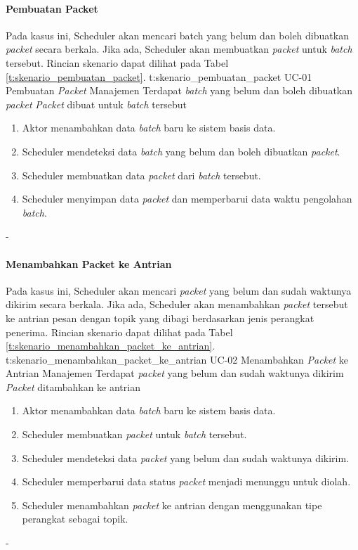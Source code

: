 \paragraph{Pembuatan Packet}
\par Pada kasus ini, Scheduler akan mencari batch yang belum dan boleh dibuatkan \textit{packet} secara berkala. Jika ada, Scheduler akan membuatkan \textit{packet} untuk \textit{batch} tersebut. Rincian skenario dapat dilihat pada Tabel \ref{t:skenario_pembuatan_packet}.
\tableUcDesc
{t:skenario_pembuatan_packet}
{UC-01}
{Pembuatan \textit{Packet}}
{Manajemen}
{Terdapat \textit{batch} yang belum dan boleh dibuatkan \textit{packet}}
{\textit{Packet} dibuat untuk \textit{batch} tersebut}
{
\begin{enumerate}
	\item Aktor menambahkan data \textit{batch} baru ke sistem basis data.
    \item Scheduler mendeteksi data \textit{batch} yang belum dan boleh dibuatkan \textit{packet}.
    \item Scheduler membuatkan data \textit{packet} dari \textit{batch} tersebut.
    \item Scheduler menyimpan data \textit{packet} dan memperbarui data waktu pengolahan \textit{batch}.
\end{enumerate}
}
{-}
\clearpage

\paragraph{Menambahkan Packet ke Antrian}
\par Pada kasus ini, Scheduler akan mencari \textit{packet} yang belum dan sudah waktunya dikirim secara berkala. Jika ada, Scheduler akan menambahkan \textit{packet} tersebut ke antrian pesan dengan topik yang dibagi berdasarkan jenis perangkat penerima. Rincian skenario dapat dilihat pada Tabel \ref{t:skenario_menambahkan_packet_ke_antrian}.
\tableUcDesc
{t:skenario_menambahkan_packet_ke_antrian}
{UC-02}
{Menambahkan \textit{Packet} ke Antrian}
{Manajemen}
{Terdapat \textit{packet} yang belum dan sudah waktunya dikirim}
{\textit{Packet} ditambahkan ke antrian}
{
\begin{enumerate}
    \item Aktor menambahkan data \textit{batch} baru ke sistem basis data.
    \item Scheduler membuatkan \textit{packet} untuk \textit{batch} tersebut.
    \item Scheduler mendeteksi data \textit{packet} yang belum dan sudah waktunya dikirim.
    \item Scheduler memperbarui data status \textit{packet} menjadi menunggu untuk diolah.
    \item Scheduler menambahkan \textit{packet} ke antrian dengan menggunakan tipe perangkat sebagai topik.
\end{enumerate}
}
{-}
\clearpage

